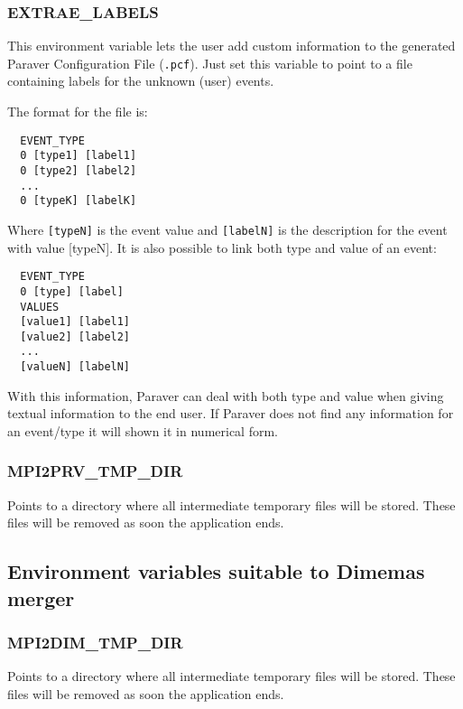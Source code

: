 \subsubsection{EXTRAE\_LABELS}

This environment variable lets the user add custom information to the generated Paraver Configuration File ({\tt .pcf}). Just set this variable to point to a file containing labels for the unknown (user) events.

The format for the file is:

\begin{verbatim}
  EVENT_TYPE
  0 [type1] [label1]
  0 [type2] [label2]
  ...
  0 [typeK] [labelK]
\end{verbatim}

Where {\tt [typeN]} is the event value and {\tt [labelN]} is the description for the event with value [typeN].
It is also possible to link both type and value of an event:

\begin{verbatim}
  EVENT_TYPE
  0 [type] [label]
  VALUES
  [value1] [label1]
  [value2] [label2]
  ...
  [valueN] [labelN]
\end{verbatim}

With this information, Paraver can deal with both type and  value when giving textual information to the end user. If Paraver does not find any information for an event/type it will shown it in numerical form.

\subsubsection{MPI2PRV\_TMP\_DIR}

Points to a directory where all intermediate temporary files will be stored. These files will be removed as soon the application ends.

\subsection{Environment variables suitable to Dimemas merger}

\subsubsection{MPI2DIM\_TMP\_DIR}

Points to a directory where all intermediate temporary files will be stored. These files will be removed as soon the application ends.

